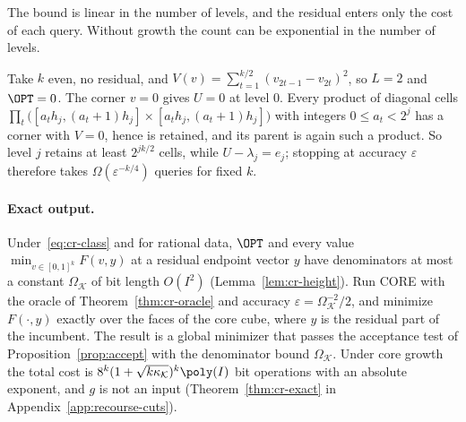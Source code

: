 The bound is linear in the number of levels, and the residual enters only
the cost of each query. Without growth the count can be exponential in the
number of levels.

\begin{example}\label{ex:cr-flat}
Take $k$ even, no residual, and
$V(v)=\sum_{t=1}^{k/2}(v_{2t-1}-v_{2t})^2$, so $L=2$ and $\OPT=0$. The corner $v=0$ gives $U=0$ at level $0$. Every product
of diagonal cells
$\prod_t\bigl([a_th_j,(a_t+1)h_j]\times[a_th_j,(a_t+1)h_j]\bigr)$ with
integers $0\le a_t<2^j$ has a
corner with $V=0$, hence is retained, and its parent is again such a
product. So level $j$ retains at least $2^{jk/2}$ cells, while
$U-\lambda_j=e_j$; stopping at accuracy $\varepsilon$ therefore takes
$\Omega(\varepsilon^{-k/4})$ queries for fixed $k$.
\end{example}

\paragraph{Exact output.}
Under~\eqref{eq:cr-class} and for rational data, $\OPT$ and every value $\min_{v\in[0,1]^k}F(v,y)$ at a
residual endpoint vector $y$ have denominators at most a constant
$\Omega_{\mathcal K}$ of bit length $O(I^2)$ (Lemma~\ref{lem:cr-height}).
Run CORE with the oracle of Theorem~\ref{thm:cr-oracle} and accuracy
$\varepsilon=\Omega_{\mathcal K}^{-2}/2$, and minimize $F(\cdot,y)$
exactly over the faces of the core cube, where $y$ is the residual part of
the incumbent. The result is a global minimizer that passes the acceptance
test of Proposition~\ref{prop:accept} with the denominator bound
$\Omega_{\mathcal K}$. Under core growth the total cost is
$8^k(1+\sqrt{k\kappa_{\mathcal K}})^k\poly(I)$ bit operations with an
absolute exponent, and $g$ is not an input (Theorem~\ref{thm:cr-exact} in
Appendix~\ref{app:recourse-cuts}).
